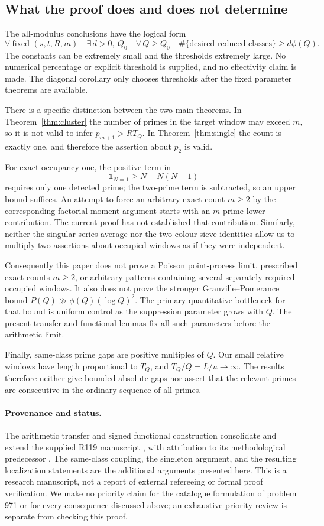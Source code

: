 \documentclass[11pt]{article}
\theoremstyle{remark}
\numberwithin{equation}{section}
\newcommand{\ind}{\mathbf 1}
\begin{document}
\subsection{What the proof does and does not determine}

The all-modulus conclusions have the logical form
\[
 \forall\ \text{fixed }(s,t,R,m)\quad
 \exists\,d>0,\ Q_0\quad
 \forall\,Q\ge Q_0\quad
 \#\{\text{desired reduced classes}\}\ge d\phi(Q).
\]
The constants can be extremely small and the thresholds extremely
large. No numerical percentage or explicit threshold is supplied,
and no effectivity claim is made.
The diagonal corollary only chooses thresholds after the fixed
parameter theorems are available.

There is a specific distinction between the two main theorems.
In Theorem~\ref{thm:cluster} the number of primes in the target
window may exceed $m$, so it is not valid to infer
$p_{m+1}>RT_Q$.
In Theorem~\ref{thm:single} the count is exactly one,
and therefore the assertion about $p_2$ is valid.

For exact occupancy one, the positive term in
\[
 \ind_{N=1}\ge N-N(N-1)
\]
requires only one detected prime; the two-prime term is subtracted,
so an upper bound suffices.
An attempt to force an arbitrary exact count $m\ge2$ by
the corresponding factorial-moment argument starts with an
$m$-prime lower contribution. The current proof has not
established that contribution. Similarly, neither the
singular-series average nor the two-colour sieve identities
allow us to multiply two assertions about occupied windows
as if they were independent.

Consequently this paper does not prove a Poisson point-process
limit, prescribed exact counts $m\ge2$, or arbitrary patterns
containing several separately required occupied windows.
It also does not prove the stronger Granville--Pomerance
bound $P(Q)\gg\phi(Q)(\log Q)^2$.
The primary quantitative bottleneck for that bound is
uniform control as the suppression parameter grows with $Q$.
The present transfer and functional lemmas fix all such
parameters before the arithmetic limit.

Finally, same-class prime gaps are positive multiples of $Q$.
Our small relative windows have length proportional to
$T_Q$, and $T_Q/Q=L/u\to\infty$.
The results therefore neither give bounded absolute gaps nor
assert that the relevant primes are consecutive in the ordinary
sequence of all primes.

\paragraph{Provenance and status.}
The arithmetic transfer and signed functional construction
consolidate and extend the supplied R119 manuscript
\cite{Meiji119}, with attribution to its methodological predecessor
\cite{OAI}. The same-class coupling, the singleton argument, and
the resulting localization statements are the additional arguments
presented here. This is a research manuscript, not a report of
external refereeing or formal proof verification. We make no
priority claim for the catalogue formulation of problem 971 or
for every consequence discussed above; an exhaustive priority
review is separate from checking this proof.
\end{document}
